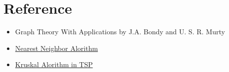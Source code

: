 \documentclass[12pt]{article}
\begin{document}
\section{Reference}
\begin{itemize}
    \item Graph Theory With Applications by J.A. Bondy and U. S. R. Murty
    \item \href{http://math.mit.edu/~goemans/18433S15/TSP-CookCPS.pdf}{Nearest Neighbor Alorithm} 
    \item \href{https://www.ams.org/journals/proc/1956-007-01/S0002-9939-1956-0078686-7/home.html}{Kruskal  Alorithm in TSP} 
\end{itemize}
\end{document}
